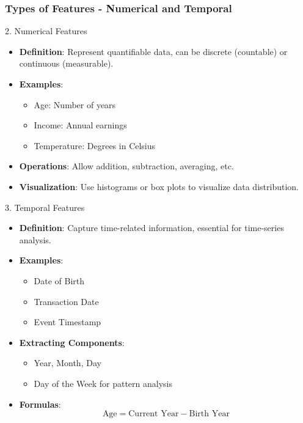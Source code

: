 \documentclass[aspectratio=169]{beamer}
\begin{document}
\begin{frame}[fragile]
    \frametitle{Types of Features - Numerical and Temporal}
    \begin{block}{2. Numerical Features}
        \begin{itemize}
            \item \textbf{Definition}: Represent quantifiable data, can be discrete (countable) or continuous (measurable).
            \item \textbf{Examples}:
            \begin{itemize}
                \item Age: Number of years
                \item Income: Annual earnings
                \item Temperature: Degrees in Celsius
            \end{itemize}
            \item \textbf{Operations}: Allow addition, subtraction, averaging, etc.
            \item \textbf{Visualization}: Use histograms or box plots to visualize data distribution.
        \end{itemize}
    \end{block}
    
    \begin{block}{3. Temporal Features}
        \begin{itemize}
            \item \textbf{Definition}: Capture time-related information, essential for time-series analysis.
            \item \textbf{Examples}:
            \begin{itemize}
                \item Date of Birth
                \item Transaction Date
                \item Event Timestamp
            \end{itemize}
            \item \textbf{Extracting Components}:
            \begin{itemize}
                \item Year, Month, Day
                \item Day of the Week for pattern analysis
            \end{itemize}
            \item \textbf{Formulas}:
            \begin{equation}
                \text{Age} = \text{Current Year} - \text{Birth Year}
            \end{equation}
        \end{itemize}
    \end{block}
\end{frame}
\end{document}
